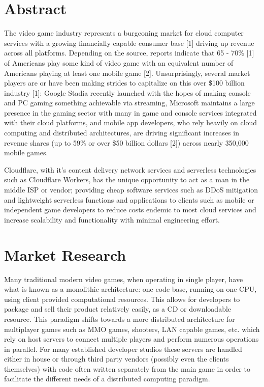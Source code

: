 \documentclass[a4paper, 11pt]{article}
\title{\header}
\author{\banner \\ \name} %
\begin{document}
\maketitle

\section{Abstract}

The video game industry represents a burgeoning market for cloud computer services with a growing financially capable consumer base [1] driving up revenue across all platforms. Depending on the source, reports indicate that 65 - 70\%  [1] of Americans play some kind of video game with an equivalent number of Americans playing at least one mobile game [2]. Unsurprisingly, several market players are or have been making strides to capitalize on this over \$100 billion industry [1]: Google Stadia recently launched with the hopes of making console and PC gaming something achievable via streaming, Microsoft maintains a large presence in the gaming sector with many in game and console services integrated with their cloud platforms, and mobile app developers, who rely heavily on cloud computing and distributed architectures, are driving significant increases in revenue shares (up to 59\% or over \$50 billion dollars [2]) across nearly 350,000 mobile games.

Cloudflare, with it's content delivery network services and serverless technologies such as Cloudflare Workers, has the unique opportunity to act as a man in the middle ISP or vendor; providing cheap software services such as DDoS mitigation and lightweight serverless functions and applications to clients such as mobile or independent game developers to reduce costs endemic to most cloud services and increase scalability and functionality with minimal engineering effort. 

\section{Market Research}

Many traditional modern video games, when operating in single player, have what is known as a monolithic architecture: one code base, running on one CPU, using client provided computational resources. This allows for developers to package and sell their product relatively easily, as a CD or downloadable resource. This paradigm shifts towards a more distributed architecture for multiplayer games such as MMO games, shooters, LAN capable games, etc. which rely on host servers to connect multiple players and perform numerous operations in parallel. For many established developer studios these servers are handled either in house or through third party vendors (possibly even the clients themselves) with code often written separately from the main game in order to facilitate the different needs of a distributed computing paradigm.
\end{document}
